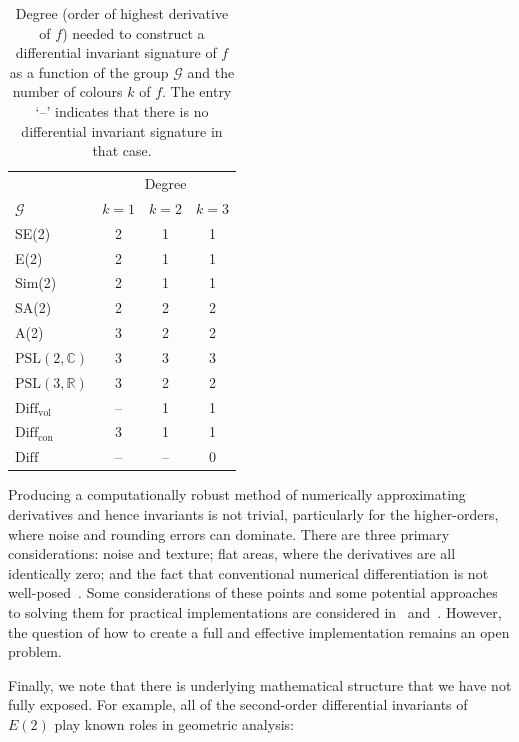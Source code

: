 \documentclass[review,onefignum,onetabnum]{siamonline190516}
\def\R{\mathbb{R}}
\begin{document}
\begin{table}[h]
\begin{center}
\begin{tabular}{| l | c c c |}
\hline
 & \multicolumn{3}{|c|}{Degree} \\
$\mathcal{G}$ & $k=1$ & $k=2$ & $k=3$ \\
\hline
SE(2) & 2 &1 & 1 \\
E(2) & 2 & 1 & 1 \\
Sim(2) & 2 & 1 & 1 \\
SA(2) & 2 & 2 & 2 \\
A(2) & 3 & 2 & 2 \\
$\mathrm{PSL}(2,\mathbb{C})$ & 3 & 3 & 3 \\
$\mathrm{PSL}(3,\R)$ & 3 & 2 & 2 \\
$\mathrm{Diff}_{\mathrm{vol}}$ & -- & 1 & 1 \\
$\mathrm{Diff}_{\mathrm{con}}$ & 3 & 1 & 1 \\
$\mathrm{Diff}$ & -- & -- & 0 \\
\hline
\end{tabular}
\caption{Degree (order of highest derivative of $f$) needed to construct a differential invariant signature of $f$ as a function of the group $\mathcal{G}$ and the number of colours $k$ of $f$. The entry `--' indicates that there is no differential invariant signature in that case.}
\label{tab:derivs}
\end{center}
\end{table}

Producing a computationally robust method of numerically approximating derivatives and hence invariants is not trivial, particularly for the higher-orders, where noise and rounding errors can dominate. There are three primary considerations: noise and texture; flat areas, where the derivatives are all identically zero; and the fact that conventional numerical differentiation is not well-posed~\cite{Florack1993}. Some considerations of these points and some potential approaches to solving them for practical implementations are considered in~\cite{Calabi1998} and~\cite{Florack1993}. However, the question of how to create a full and effective implementation remains an open problem.

Finally, we note that there is underlying mathematical structure that we have not fully exposed. For example, all of the second-order differential invariants of $E(2)$ play known roles in geometric analysis:
\end{document}
